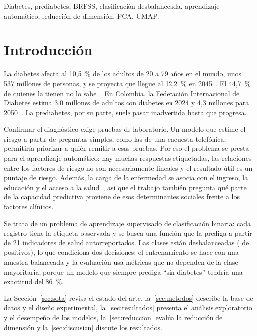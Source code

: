 \documentclass[journal]{IEEEtran}
\begin{document}
\begin{IEEEkeywords}
Diabetes, prediabetes, BRFSS, clasificación desbalanceada, aprendizaje automático, reducción de dimensión, PCA, UMAP.
\end{IEEEkeywords}

\section{Introducción}
La diabetes afecta al 10,5~\% de los adultos de 20 a 79 años en el mundo, unos 537 millones de personas, y se proyecta que llegue al 12,2~\% en 2045~\cite{sun2022}. El 44,7~\% de quienes la tienen no lo sabe~\cite{ogurtsova2022}. En Colombia, la Federación Internacional de Diabetes estima 3,0 millones de adultos con diabetes en 2024 y 4,3 millones para 2050~\cite{idf2025}. La prediabetes, por su parte, suele pasar inadvertida hasta que progresa.

Confirmar el diagnóstico exige pruebas de laboratorio. Un modelo que estime el riesgo a partir de preguntas simples, como las de una encuesta telefónica, permitiría priorizar a quién remitir a esas pruebas. Por eso el problema se presta para el aprendizaje automático: hay muchas respuestas etiquetadas, las relaciones entre los factores de riesgo no son necesariamente lineales y el resultado útil es un puntaje de riesgo. Además, la carga de la enfermedad se asocia con el ingreso, la educación y el acceso a la salud~\cite{hillbriggs2021}, así que el trabajo también pregunta qué parte de la capacidad predictiva proviene de esos determinantes sociales frente a los factores clínicos.

Se trata de un problema de aprendizaje supervisado de clasificación binaria: cada registro tiene la etiqueta observada y se busca una función que la prediga a partir de 21 indicadores de salud autorreportados. Las clases están desbalanceadas (\prevalencia{} de positivos), lo que condiciona dos decisiones: el entrenamiento se hace con una muestra balanceada y la evaluación usa métricas que no dependen de la clase mayoritaria, porque un modelo que siempre prediga ``sin diabetes'' tendría una exactitud del 86~\%.

La Sección~\ref{sec:sota} revisa el estado del arte, la~\ref{sec:metodos} describe la base de datos y el diseño experimental, la~\ref{sec:resultados} presenta el análisis exploratorio y el desempeño de los modelos, la~\ref{sec:reduccion} evalúa la reducción de dimensión y la~\ref{sec:discusion} discute los resultados.
\end{document}
